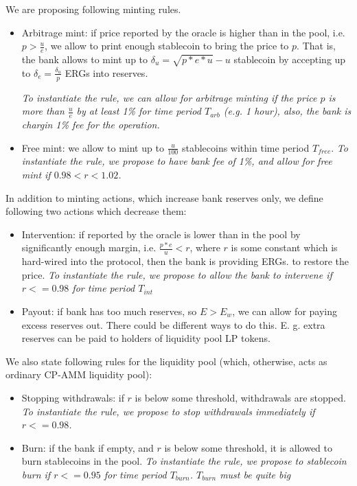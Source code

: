 \documentclass{article}   %
\newcommand{\bc}{ERG}
\newcommand{\sct}{stablecoin}
\begin{document}
We are proposing following minting rules.  

\begin{itemize}
  \item{Arbitrage mint: } if price reported by the oracle is higher than in the pool, i.e. $p > \frac{u}{e}$, we allow to print enough \sct{} to bring the price to $p$. That is, the bank allows to mint up to $\delta_u = \sqrt{p*e*u}-u$ \sct{} by accepting up to $\delta_e = \frac{\delta_u}{p}$ \bc{}s into reserves. 

  \em{To instantiate the rule, we can allow for arbitrage minting if the price $p$ is more than $\frac{u}{e}$ by at least 1\% for time period $T_{arb}$ (e.g. 1 hour), also, the bank is chargin 1\% fee 
  for the operation.} 

  \item{Free mint: } we allow to mint up to $\frac{u}{100}$ \sct{}s within time period $T_{free}$. 
  \em{To instantiate the rule, we propose to have bank fee of 1\%, and allow for free mint if $0.98 < r < 1.02$}.
\end{itemize}  


In addition to minting actions, which increase bank reserves only, we define following two actions which decrease them: 

\begin{itemize}
   \item{Intervention: } if reported by the oracle is lower than in the pool by significantly enough margin, i.e. $\frac{p*e}{u} < r$, where $r$ is some constant which is hard-wired into the protocol, then the bank is providing \bc{}s. to restore the price.
   \em{To instantiate the rule, we propose to allow the bank to intervene if $r <= 0.98$ for time period $T_{int}$}
   \item{Payout: } if bank has too much reserves, so $E > E_w$, we can allow for paying excess reserves out. There could be different ways to do this. E. g. extra reserves can be paid to holders of
   liquidity pool LP tokens.
\end{itemize}


We also state following rules for the liquidity pool (which, otherwise, acts as ordinary CP-AMM liquidity pool): 

\begin{itemize}
   \item{Stopping withdrawals: } if $r$ is below some threshold, withdrawals are stopped.  
   \em{To instantiate the rule, we propose to stop withdrawals immediately if $r <= 0.98$.}
   \item{Burn: } if the bank if empty, and $r$ is below some threshold, it is allowed to burn \sct{}s in the pool. 
   \em{To instantiate the rule, we propose to \sct{} burn if $r <= 0.95$ for time period $T_{burn}$. $T_{burn}$ must be quite big}
\end{itemize} 
\end{document}
